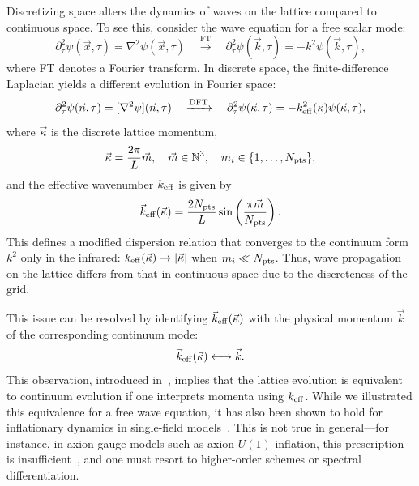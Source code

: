 \documentclass[aps, nofootinbib,superscriptaddress, preprintnumbers, longbibliography]{article}
\begin{document}
Discretizing space alters the dynamics of waves on the lattice compared to continuous space. To see this, consider the wave equation for a free scalar mode:
\begin{equation}
\partial_\tau^2 \psi(\vec{x}, \tau) = \nabla^2 \psi(\vec{x}, \tau) \quad \xrightarrow{\text{FT}} \quad \partial_\tau^2 \psi(\vec{k}, \tau) = -k^2 \psi(\vec{k}, \tau),
\end{equation}
where FT denotes a Fourier transform. In discrete space, the finite-difference Laplacian yields a different evolution in Fourier space:
\begin{equation}
\partial_\tau^2 \psi(\vec{n}, \tau) = [\nabla^2 \psi](\vec{n}, \tau) \quad \xrightarrow{\text{DFT}} \quad \partial_\tau^2 \psi(\vec{\kappa}, \tau) = -k_{\rm eff}^2(\vec{\kappa}) \psi(\vec{\kappa}, \tau),
\end{equation}
where $\vec{\kappa}$ is the discrete lattice momentum,
\begin{equation}
\vec{\kappa} = \frac{2\pi}{L} \vec{m}, \quad \vec{m} \in \mathbb{N}^3, \quad m_i \in \{1, \dots, N_{\rm pts}\},
\end{equation}
and the effective wavenumber $k_{\rm eff}$ is given by
\begin{equation}
\label{eq:eff}
\vec{k}_{\rm eff}(\vec{\kappa}) = \frac{2N_{\rm pts}}{L} \sin\left( \frac{\pi \vec{m}}{N_{\rm pts}} \right).
\end{equation}
This defines a modified dispersion relation that converges to the continuum form $k^2$ only in the infrared: $k_{\rm eff}(\vec{\kappa}) \to |\vec{\kappa}|$ when $m_i \ll N_{\rm pts}$. Thus, wave propagation on the lattice differs from that in continuous space due to the discreteness of the grid.

This issue can be resolved by identifying $\vec{k}_{\rm eff}(\vec{\kappa})$ with the physical momentum $\vec{k}$ of the corresponding continuum mode:
\begin{equation}
\vec{k}_{\rm eff}(\vec{\kappa}) \longleftrightarrow \vec{k}.
\end{equation}
This observation, introduced in~\cite{Caravano:2021pgc}, implies that the lattice evolution is equivalent to continuum evolution if one interprets momenta using $k_{\rm eff}$. While we illustrated this equivalence for a free wave equation, it has also been shown to hold for inflationary dynamics in single-field models~\cite{Caravano:2021pgc,Caravano:2022yyv}. This is not true in general—for instance, in axion-gauge models such as axion-$U(1)$ inflation, this prescription is insufficient~\cite{Caravano:2021bfn,Caravano:2022epk}, and one must resort to higher-order schemes or spectral differentiation.
\end{document}
